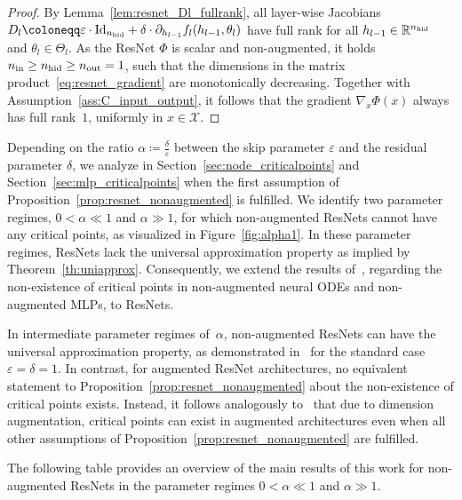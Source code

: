 \documentclass[10pt]{article}
\theoremstyle{definition}
\numberwithin{equation}{section}
\newcommand{\eps}{\varepsilon}
\newcommand{\R}{\mathbb{R}}
\newcommand*{\nout}{n_\textup{out}}
\newcommand*{\nhid}{n_\textup{hid}}
\newcommand*{\nin}{n_\textup{in}}
\begin{document}
\begin{proof}
	By Lemma~\ref{lem:resnet_Dl_fullrank}, all layer-wise Jacobians $D_l \coloneqq \eps \cdot \textup{Id}_{\nhid} + \delta \cdot \partial_{h_{l-1}}f_l(h_{l-1},\theta_l)$ have full rank for all $h_{l-1} \in \R^{\nhid}$ and $\theta_l \in \Theta_l$.	
	As the ResNet $\Phi$ is scalar and non-augmented, it holds $\nin \geq \nhid \geq \nout = 1$, such that the dimensions in the matrix product~\eqref{eq:resnet_gradient} are monotonically decreasing. Together with Assumption~\ref{ass:C_input_output}, it follows that the gradient $\nabla_x \Phi(x)$ always has full rank~$1$, uniformly in $x \in \mathcal{X}$. 
\end{proof}

Depending on the ratio $\alpha \coloneqq \frac{\delta}{\eps}$ between the skip parameter $\eps$ and the residual parameter $\delta$, we analyze in Section~\ref{sec:node_criticalpoints} and Section~\ref{sec:mlp_criticalpoints} when the first assumption of Proposition~\ref{prop:resnet_nonaugmented} is fulfilled. We identify two parameter regimes, $0<\alpha \ll 1$ and $\alpha \gg 1$, for which non-augmented ResNets cannot have any critical points, as visualized in Figure~\ref{fig:alpha1}. In these parameter regimes, ResNets lack the universal approximation property as implied by Theorem~\ref{th:uniapprox}. Consequently, we extend the results of~\cite{kk2025}, regarding the non-existence of critical points in non-augmented neural ODEs and non-augmented MLPs, to ResNets. 

In intermediate parameter regimes of~$\alpha$, non-augmented ResNets can have the universal approximation property, as demonstrated in~\cite{Lin2018} for the standard case $\eps = \delta = 1$. In contrast, for augmented ResNet architectures, no equivalent statement to Proposition~\ref{prop:resnet_nonaugmented} about the non-existence of critical points exists. Instead, it follows analogously to~\cite[Theorem~3.18]{kk2025} that due to dimension augmentation, critical points can exist in augmented architectures even when all other assumptions of Proposition~\ref{prop:resnet_nonaugmented} are fulfilled. 

The following table provides an overview of the main results of this work for non-augmented ResNets in the parameter regimes $0<\alpha \ll 1$ and $\alpha \gg 1$. 
\end{document}
